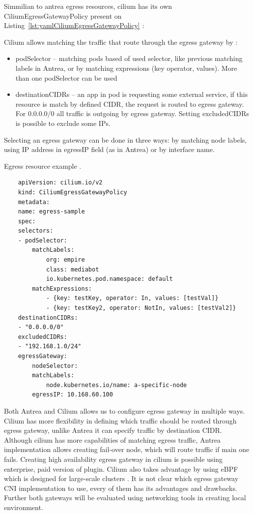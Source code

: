 Simmilian to antrea egress resources, cilium has its own CiliumEgressGatewayPolicy present on Listing~\ref{lst:yamlCiliumEgressGatewayPolicy} \cite{CiliumEgressGateway}:

Cilium allows matching the traffic that route through the egress gateway by \cite{CiliumEgressGateway}:
\begin{itemize}
    \item podSelector -- matching pods based of used selector, like previous matching labels in Antrea, or by matching expressions (key operator, values). More than one podSelector can be used
    \item destinationCIDRs -- an app in pod is requesting some external service, if this resource is match by defined CIDR, the request is routed to egress gateway. For 0.0.0.0/0 all traffic is outgoing by egress gateway. Setting excludedCIDRs is possible to exclude some IPs.
\end{itemize}

Selecting an egress gateway can be done in three ways: by matching node labels, using IP address in egressIP field (as in Antrea) or by interface name. 

\begin{listing}[htb]
    \centering
    \caption{Egress resource example \cite{AntreaEgressArch}.}
    \begin{verbatim}
    apiVersion: cilium.io/v2
    kind: CiliumEgressGatewayPolicy
    metadata:
    name: egress-sample
    spec:
    selectors:
    - podSelector:
        matchLabels:
            org: empire
            class: mediabot
            io.kubernetes.pod.namespace: default
        matchExpressions:
            - {key: testKey, operator: In, values: [testVal]}
            - {key: testKey2, operator: NotIn, values: [testVal2]}
    destinationCIDRs:
    - "0.0.0.0/0"
    excludedCIDRs:
    - "192.168.1.0/24"
    egressGateway:
        nodeSelector:
        matchLabels:
            node.kubernetes.io/name: a-specific-node
        egressIP: 10.168.60.100
    \end{verbatim}
    \label{lst:yamlCiliumEgressGatewayPolicy}
\end{listing}


Both Antrea and Cilium allows us to configure egress gateway in multiple ways. Cilium has more flexibility in defining which traffic should be routed through egress gateway, unlike Antrea it can specify traffic by destination CIDR. Although cilium has more capabilities of matching egress traffic, Antrea implementation allows creating fail-over node, which will route traffic if main one fails. Creating high availability egress gateway in cilium is possible using enterprise, paid version of plugin. Cilium also takes advantage by using eBPF which is designed for large-scale clusters \cite{CiliumOverview}. It is not clear which egress gateway CNI implementation to use, every of them has its advantages and drawbacks. Further both gateways will be evaluated using networking tools in creating local environment.




